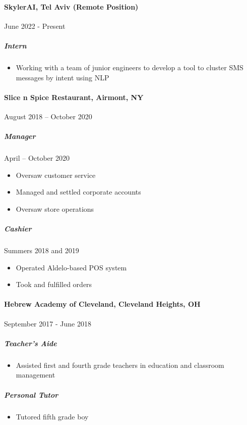 \documentclass[10pt]{article}
\begin{document}
    \paragraph{SkylerAI, Tel Aviv (Remote Position)} \hfill June 2022 - Present
    \subparagraph*{Intern}
    \begin{itemize}
        \item Working with a team of junior engineers to develop a tool to cluster SMS messages by intent using NLP
    \end{itemize}

    \paragraph*{Slice n Spice Restaurant, Airmont, NY} \hfill August 2018 – October 2020
    \subparagraph*{Manager} \hfill April – October 2020
    \begin{itemize}
        \item Oversaw customer service
        \item Managed and settled corporate accounts
        \item Oversaw store operations
    \end{itemize}
    \subparagraph*{Cashier} \hfill Summers 2018 and 2019
    \begin{itemize}
        \item Operated Aldelo-based POS system
        \item Took and fulfilled orders
    \end{itemize}

    \paragraph*{Hebrew Academy of Cleveland, Cleveland Heights, OH} \hfill  September 2017 - June 2018
    \subparagraph*{Teacher's Aide}
    \begin{itemize}
        \item  Assisted first and fourth grade teachers in education and classroom management
    \end{itemize}
    \subparagraph*{Personal Tutor}
    \begin{itemize}
        \item Tutored fifth grade boy
    \end{itemize}

\end{document}
